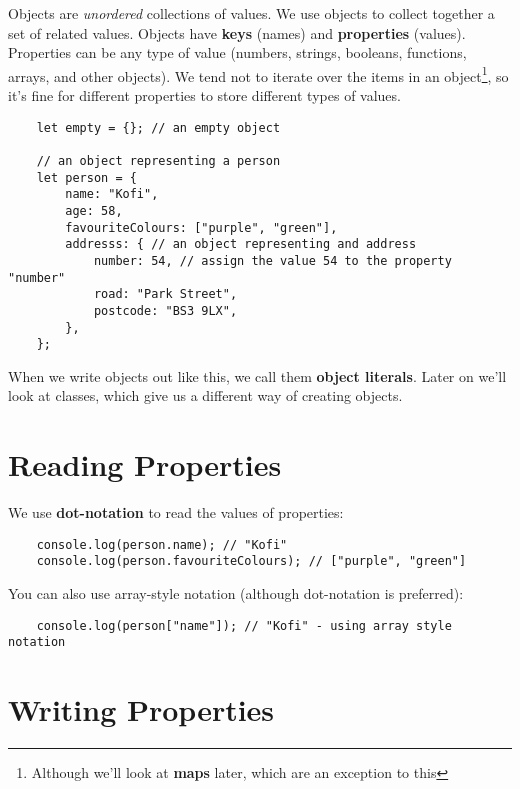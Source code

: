 Objects are \textit{unordered} collections of values. We use objects to collect together a set of related values. Objects have \textbf{keys} (names) and \textbf{properties} (values).
\\

Properties can be any type of value (numbers, strings, booleans, functions, arrays, and other objects). We tend not to iterate over the items in an object\footnote{Although we'll look at \textbf{maps} later, which are an exception to this}, so it's fine for different properties to store different types of values.

\begin{verbatim}
    let empty = {}; // an empty object

    // an object representing a person
    let person = {
        name: "Kofi",
        age: 58,
        favouriteColours: ["purple", "green"],
        addresss: { // an object representing and address
            number: 54, // assign the value 54 to the property "number"
            road: "Park Street",
            postcode: "BS3 9LX",
        },
    };
\end{verbatim}

When we write objects out like this, we call them \textbf{object literals}. Later on we'll look at classes, which give us a different way of creating objects.

\pagebreak

\section{Reading Properties}

We use \textbf{dot-notation} to read the values of properties:

\begin{verbatim}
    console.log(person.name); // "Kofi"
    console.log(person.favouriteColours); // ["purple", "green"]
\end{verbatim}

You can also use array-style notation (although dot-notation is preferred):

\begin{verbatim}
    console.log(person["name"]); // "Kofi" - using array style notation
\end{verbatim}

\section{Writing Properties}

